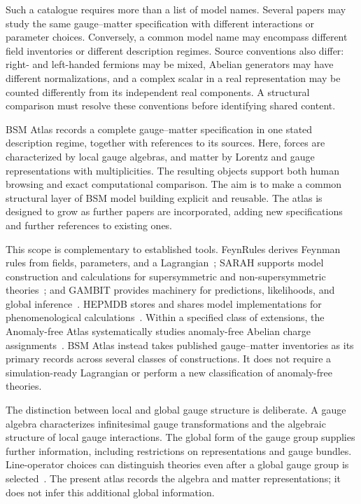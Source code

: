 Such a catalogue requires more than a list of model names. Several papers may study the same gauge--matter specification with different interactions or parameter choices. Conversely, a common model name may encompass different field inventories or different description regimes. Source conventions also differ: right- and left-handed fermions may be mixed, Abelian generators may have different normalizations, and a complex scalar in a real representation may be counted differently from its independent real components. A structural comparison must resolve these conventions before identifying shared content.

BSM Atlas records a complete gauge--matter specification in one stated description regime, together with references to its sources. Here, forces are characterized by local gauge algebras, and matter by Lorentz and gauge representations with multiplicities. The resulting objects support both human browsing and exact computational comparison. The aim is to make a common structural layer of BSM model building explicit and reusable. The atlas is designed to grow as further papers are incorporated, adding new specifications and further references to existing ones.

This scope is complementary to established tools. FeynRules derives Feynman rules from fields, parameters, and a Lagrangian~\cite{FeynRules}; SARAH supports model construction and calculations for supersymmetric and non-supersymmetric theories~\cite{SARAH}; and GAMBIT provides machinery for predictions, likelihoods, and global inference~\cite{GAMBIT}. HEPMDB stores and shares model implementations for phenomenological calculations~\cite{HEPMDB}. Within a specified class of extensions, the Anomaly-free Atlas systematically studies anomaly-free Abelian charge assignments~\cite{AnomalyAtlas}. BSM Atlas instead takes published gauge--matter inventories as its primary records across several classes of constructions. It does not require a simulation-ready Lagrangian or perform a new classification of anomaly-free theories.

The distinction between local and global gauge structure is deliberate. A gauge algebra characterizes infinitesimal gauge transformations and the algebraic structure of local gauge interactions. The global form of the gauge group supplies further information, including restrictions on representations and gauge bundles. Line-operator choices can distinguish theories even after a global gauge group is selected~\cite{GlobalStructure}. The present atlas records the algebra and matter representations; it does not infer this additional global information.

